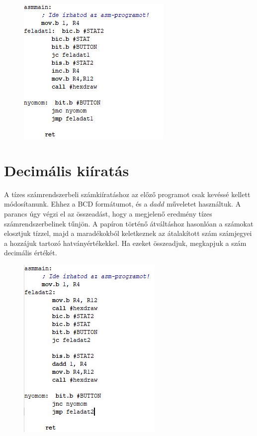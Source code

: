 \documentclass[10pt, conference, a4paper]{ITKproc}
\begin{document}
\begin{figure}[h]
\includegraphics[scale=0.65]{elsodolog}
\centering
\end{figure}

\section{Decimális kiíratás}
A tízes számrendszerbeli számkiíratáshoz az előző programot csak kevéssé kellett módosítanunk. Ehhez a BCD formátumot, és a $dadd$ műveletet használtuk. A parancs úgy végzi el az összeadást, hogy a megjelenő eredmény tízes számrendszerbelinek tűnjön. A papíron történő átváltáshoz hasonlóan a számokat elosztjuk tízzel, majd a maradékokból keletkeznek az átalakított szám számjegyei a hozzájuk tartozó hatványértékekkel. Ha ezeket összeadjuk, megkapjuk a szám decimális értékét. 

\begin{figure}[h]
\includegraphics[scale=0.65]{masodikdolog}
\centering
\end{figure}
\end{document}
